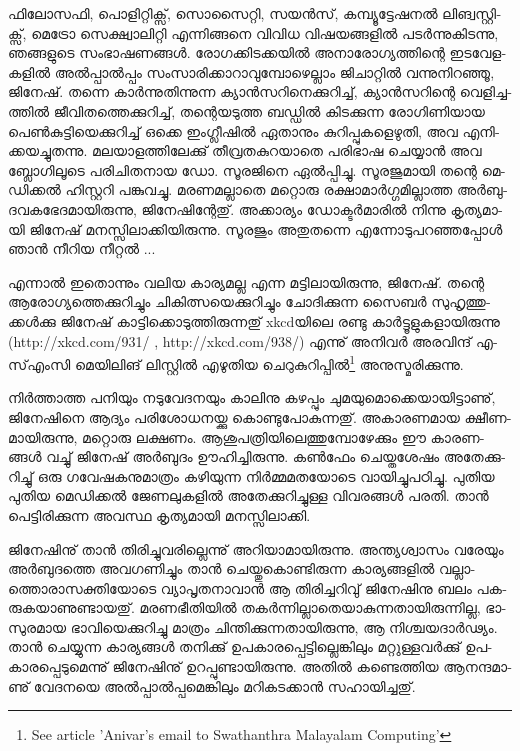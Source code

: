 ­ഫി­ലോ­സ­ഫി, പൊ­ളി­റ്റി­ക്സ്, സൊ­സൈ­റ്റി, സയന്‍­സ്, കമ്പ്യൂ­ട്ടേ­ഷ­നല്‍ ലി­ങ്വ­സ്റ്റി­ക്സ്, മെ­ട്രോ സെ­ക്ഷ്വാ­ലി­റ്റി എന്നി­ങ്ങ­നെ വി­വിധ 
വി­ഷ­യ­ങ്ങ­ളില്‍ പടര്‍­ന്നു­കി­ട­ന്നു, ഞങ്ങ­ളു­ടെ സം­ഭാ­ഷ­ണ­ങ്ങള്‍. രോ­ഗ­ക്കി­ട­ക്ക­യില്‍ അനാ­രോ­ഗ്യ­ത്തി­ന്റെ ഇട­വേ­ള­ക­ളില്‍ 
അല്‍­പ്പാല്‍­പ്പം സം­സാ­രി­ക്കാ­റാ­വു­മ്പോ­ഴെ­ല്ലാം ജി­ചാ­റ്റില്‍ വന്നു­നി­റ­ഞ്ഞൂ, ജി­നേ­ഷ്. തന്നെ കാര്‍­ന്നു­തി­ന്നു­ന്ന ക്യാന്‍­സ­റി­നെ­ക്കു­റി­ച്ച്, 
ക്യാന്‍­സ­റി­ന്റെ വെ­ളി­ച്ച­ത്തില്‍ ജീ­വി­ത­ത്തെ­ക്കു­റി­ച്ച്, തന്റെ­യ­ടു­ത്ത ബഡ്ഡില്‍ കി­ട­ക്കു­ന്ന രോ­ഗി­ണി­യായ പെണ്‍­കു­ട്ടി­യെ­ക്കു­റി­ച്ച് 
ഒക്കെ ഇം­ഗ്ലീ­ഷില്‍ ഏതാ­നും കു­റി­പ്പു­ക­ളെ­ഴു­തി, അവ എനി­ക്ക­യ­ച്ചു­ത­ന്നു. മല­യാ­ള­ത്തി­ലേ­ക്കു് തീ­വ്ര­ത­കു­റ­യാ­തെ പരി­ഭാഷ ചെ­യ്യാന്‍ 
അവ ബ്ലോ­ഗി­ലൂ­ടെ പരി­ചി­ത­നായ ഡോ. സൂ­ര­ജി­നെ ഏല്‍­പ്പി­ച്ചു. സൂ­ര­ജു­മാ­യി തന്റെ മെ­ഡി­ക്കല്‍ ഹി­സ്റ്റ­റി പങ്കു­വ­ച്ചു. മര­ണ­മ­ല്ലാ­തെ 
മറ്റൊ­രു രക്ഷാ­മാര്‍­ഗ്ഗ­മി­ല്ലാ­ത്ത അര്‍­ബു­ദ­വ­ക­ഭേ­ദ­മാ­യി­രു­ന്നു, ജി­നേ­ഷി­ന്റേ­തു്. അക്കാ­ര്യം ഡോ­ക്ടര്‍­മാ­രില്‍ നി­ന്നു കൃ­ത്യ­മാ­യി 
ജി­നേ­ഷ് മന­സ്സി­ലാ­ക്കി­യി­രു­ന്നു. സൂ­ര­ജും അതു­ത­ന്നെ എന്നോ­ടു­പ­റ­ഞ്ഞ­പ്പോള്‍ ഞാന്‍ നീ­റിയ നീ­റ്റല്‍ ...

എ­ന്നാല്‍ ഇതൊ­ന്നും വലിയ കാ­ര്യ­മ­ല്ല എന്ന മട്ടി­ലാ­യി­രു­ന്നു, ജി­നേ­ഷ്. തന്റെ ആരോ­ഗ്യ­ത്തെ­ക്കു­റി­ച്ചും ചി­കി­ത്സ­യെ­ക്കു­റി­ച്ചും 
ചോ­ദി­ക്കു­ന്ന സൈ­ബര്‍ സു­ഹൃ­ത്തു­ക്കള്‍­ക്കു ജി­നേ­ഷ് കാ­ട്ടി­ക്കൊ­ടു­ത്തി­രു­ന്ന­തു് xkcd­യി­ലെ രണ്ടു കാര്‍­ട്ടൂ­ളു­ക­ളാ­യി­രു­ന്നു 
(http://xkcd.com/931/  , http://xkcd.com/938/) എന്നു് അനി­വര്‍ അര­വി­ന്ദ് എ­സ്എം­സി­ മെ­യി­ലി­ങ് ലി­സ്റ്റില്‍ എഴു­തിയ 
ചെ­റു­കു­റി­പ്പില്‍\footnote{See article 'Anivar's email to Swathanthra Malayalam Computing'} അനു­സ്മ­രി­ക്കു­ന്നു­. 

നിര്‍­ത്താ­ത്ത പനി­യും നടു­വേ­ദ­ന­യും കാ­ലി­നു കഴ­പ്പും ചു­മ­യു­മൊ­ക്കെ­യാ­യി­ട്ടാ­ണു്, ജി­നേ­ഷി­നെ ആദ്യം പരി­ശോ­ധ­ന­യ്ക്കു 
കൊ­ണ്ടു­പോ­കു­ന്ന­തു്. അകാ­ര­ണ­മായ ക്ഷീ­ണ­മാ­യി­രു­ന്നു, മറ്റൊ­രു ലക്ഷ­ണം. ആശു­പ­ത്രി­യി­ലെ­ത്തു­മ്പോ­ഴേ­ക്കും ഈ 
കാ­ര­ണ­ങ്ങള്‍ വച്ചു് ജി­നേ­ഷ് അര്‍­ബു­ദം ഊഹി­ച്ചി­രു­ന്നു. കണ്‍­ഫേം ചെ­യ്ത­ശേ­ഷം അതേ­ക്കു­റി­ച്ചു് ഒരു ഗവേ­ഷ­ക­നു­മാ­ത്രം 
കഴി­യു­ന്ന നിര്‍­മ്മ­മ­ത­യോ­ടെ വാ­യി­ച്ചു­പ­ഠി­ച്ചു. പു­തിയ പു­തിയ മെ­ഡി­ക്കല്‍ ജേ­ണ­ലു­ക­ളില്‍ അതേ­ക്കു­റി­ച്ചു­ള്ള വി­വ­ര­ങ്ങള്‍ പര­തി. 
താന്‍ പെ­ട്ടി­രി­ക്കു­ന്ന അവ­സ്ഥ കൃ­ത്യ­മാ­യി മന­സ്സി­ലാ­ക്കി­.

­ജി­നേ­ഷി­നു് താന്‍ തി­രി­ച്ചു­വ­രി­ല്ലെ­ന്നു് അറി­യാ­മാ­യി­രു­ന്നു. അന്ത്യ­ശ്വാ­സം വരേ­യും അര്‍­ബു­ദ­ത്തെ അവ­ഗ­ണി­ച്ചും താന്‍ 
ചെ­യ്തു­കൊ­ണ്ടി­രു­ന്ന കാ­ര്യ­ങ്ങ­ളില്‍ വല്ലാ­ത്തൊ­രാ­സ­ക്തി­യോ­ടെ വ്യാ­പൃ­ത­നാ­വാന്‍ ആ തി­രി­ച്ച­റി­വു് ജി­നേ­ഷി­നു ബലം 
പക­രു­ക­യാ­ണു­ണ്ടാ­യ­തു്. മര­ണ­ഭീ­തി­യില്‍ തകര്‍­ന്നി­ല്ലാ­തെ­യാ­കു­ന്ന­താ­യി­രു­ന്നി­ല്ല, ഭാ­സു­ര­മായ ഭാ­വി­യെ­ക്കു­റി­ച്ചു മാ­ത്രം 
ചി­ന്തി­ക്കു­ന്ന­താ­യി­രു­ന്നു, ആ നി­ശ്ച­യ­ദാര്‍­ഢ്യം. താന്‍ ചെ­യ്യു­ന്ന കാ­ര്യ­ങ്ങള്‍ തനി­ക്കു് ഉപ­കാ­ര­പ്പെ­ട്ടി­ല്ലെ­ങ്കി­ലും മറ്റു­ള്ള­വര്‍­ക്കു് 
ഉപ­കാ­ര­പ്പെ­ടു­മെ­ന്നു് ജി­നേ­ഷി­നു് ഉറ­പ്പു­ണ്ടാ­യി­രു­ന്നു. അതില്‍ കണ്ടെ­ത്തിയ ആന­ന്ദ­മാ­ണു് വേ­ദ­ന­യെ അല്‍­പ്പാല്‍­പ്പ­മെ­ങ്കി­ലും 
മറി­ക­ട­ക്കാന്‍ സഹാ­യി­ച്ച­തു്.

